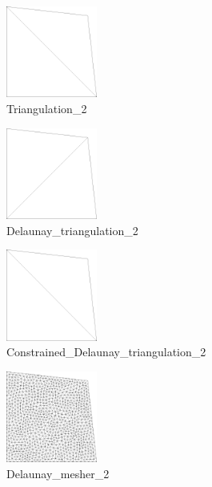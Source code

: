 \begin{figure}[!htbp]
  \centering
  \includegraphics[height=3cm]{fig/1/1.png}
  \caption{Triangulation\_2}
  \label{fig:1-1}
\end{figure}
\begin{figure}[!htbp]
  \centering
  \includegraphics[height=3cm]{fig/1/2.png}
  \caption{Delaunay\_triangulation\_2}
  \label{fig:1-2}
\end{figure}
\begin{figure}[!htbp]
  \centering
  \includegraphics[height=3cm]{fig/1/3.png}
  \caption{Constrained\_Delaunay\_triangulation\_2}
  \label{fig:1-3}
\end{figure}
\begin{figure}[!htbp]
  \centering
  \includegraphics[height=3cm]{fig/1/4.png}
  \caption{Delaunay\_mesher\_2}
  \label{fig:1-4}
\end{figure}

